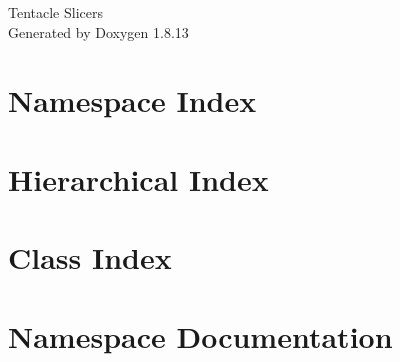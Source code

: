 \documentclass[twoside]{book}
\newcommand{\+}{\discretionary{\mbox{\scriptsize$\hookleftarrow$}}{}{}}
\newcommand{\clearemptydoublepage}{%
  \newpage{\pagestyle{empty}\cleardoublepage}%
}
\begin{document}
\hypersetup{pageanchor=false,
             bookmarksnumbered=true,
             pdfencoding=unicode
            }
\begin{titlepage}
\vspace*{7cm}
\begin{center}%
{\Large Tentacle Slicers }\\
\vspace*{1cm}
{\large Generated by Doxygen 1.8.13}\\
\end{center}
\end{titlepage}
\clearemptydoublepage
{}
\tableofcontents
\clearemptydoublepage
{}
\hypersetup{pageanchor=true}

\chapter{Namespace Index}

\chapter{Hierarchical Index}

\chapter{Class Index}

\chapter{Namespace Documentation}















\end{document}
